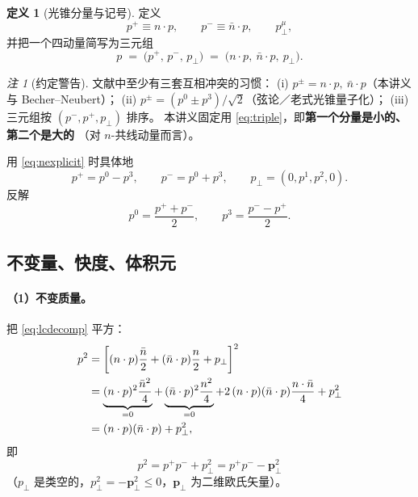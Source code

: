 \documentclass[UTF8,a4paper,11pt]{ctexart}
\theoremstyle{definition}
\newtheorem{definition}{定义}[section]
\theoremstyle{remark}
\newtheorem{remark}{注}[section]
\theoremstyle{plain}
\newcommand{\pperp}{\bm{p}_\perp}
\begin{document}
\begin{definition}[光锥分量与记号]
定义
\begin{equation}
  p^+\equiv n\cdot p,
  \qquad
  p^-\equiv \bar n\cdot p,
  \qquad
  p_\perp^\mu ,
\end{equation}
并把一个四动量简写为三元组
\begin{equation}
  p \;=\; \big(p^+,\,p^-,\,p_\perp\big)
  \;=\;\big(n\cdot p,\ \bar n\cdot p,\ p_\perp\big).
  \label{eq:triple}
\end{equation}
\end{definition}

\begin{remark}[约定警告]
文献中至少有三套互相冲突的习惯：
(i) $p^\pm=n\cdot p,\ \bar n\cdot p$（本讲义与 Becher--Neubert）；
(ii) $p^\pm=(p^0\pm p^3)/\sqrt2$（弦论／老式光锥量子化）；
(iii) 三元组按 $(p^-,p^+,p_\perp)$ 排序。
本讲义固定用 \eqref{eq:triple}，即\textbf{第一个分量是小的、第二个是大的}
（对 $n$-共线动量而言）。
\end{remark}

用 \eqref{eq:nexplicit} 时具体地
\begin{equation}
  p^+=p^0-p^3,
  \qquad
  p^-=p^0+p^3,
  \qquad
  p_\perp=(0,p^1,p^2,0).
  \label{eq:pmexplicit}
\end{equation}
反解
\begin{equation}
  p^0=\frac{p^++p^-}{2},\qquad p^3=\frac{p^--p^+}{2}.
  \label{eq:inverse}
\end{equation}

\subsection{不变量、快度、体积元}

\paragraph{（1）不变质量。}把 \eqref{eq:lcdecomp} 平方：
\begin{align}
  p^2
  &=\left[(n\cdot p)\frac{\bar n}{2}+(\bar n\cdot p)\frac{n}{2}+p_\perp\right]^2
   \notag\\
  &=\underbrace{(n\cdot p)^2\frac{\bar n^2}{4}}_{=0}
   +\underbrace{(\bar n\cdot p)^2\frac{n^2}{4}}_{=0}
   +2\,(n\cdot p)(\bar n\cdot p)\frac{n\cdot\bar n}{4}
   +p_\perp^2
   \notag\\
  &=(n\cdot p)(\bar n\cdot p)+p_\perp^2 ,
\end{align}
即
\begin{equation}
  \boxed{\;p^2=p^+p^-+p_\perp^2=p^+p^--\pperp^2\;}
  \label{eq:psq}
\end{equation}
（$p_\perp$ 是类空的，$p_\perp^2=-\pperp^2\le0$，$\pperp$ 为二维欧氏矢量）。
\end{document}
